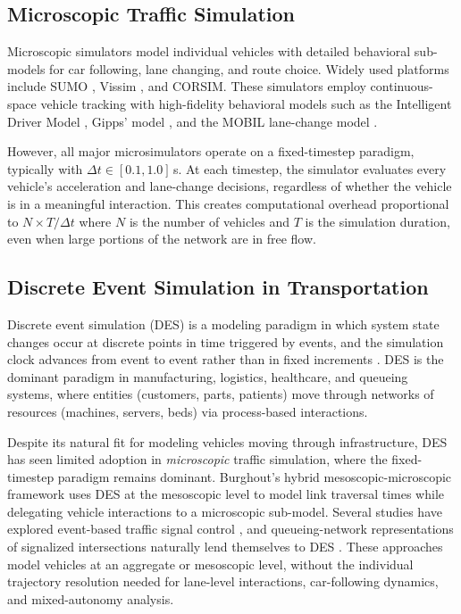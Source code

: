 \documentclass[review,authoryear]{elsarticle}
\begin{document}
\subsection{Microscopic Traffic Simulation}
\label{sec:lit_microsim}

Microscopic simulators model individual vehicles with detailed behavioral sub-models for car following, lane changing, and route choice. Widely used platforms include SUMO \citep{lopez2018microscopic}, Vissim \citep{fellendorf2010microscopic}, and CORSIM. These simulators employ continuous-space vehicle tracking with high-fidelity behavioral models such as the Intelligent Driver Model \citep[IDM;][]{treiber2000congested}, Gipps' model \citep{gipps1981behavioural}, and the MOBIL lane-change model \citep{kesting2007general}.

However, all major microsimulators operate on a fixed-timestep paradigm, typically with $\Delta t \in [0.1, 1.0]$\,s. At each timestep, the simulator evaluates every vehicle's acceleration and lane-change decisions, regardless of whether the vehicle is in a meaningful interaction. This creates computational overhead proportional to $N \times T / \Delta t$ where $N$ is the number of vehicles and $T$ is the simulation duration, even when large portions of the network are in free flow.

\subsection{Discrete Event Simulation in Transportation}
\label{sec:lit_des}

Discrete event simulation (DES) is a modeling paradigm in which system state changes occur at discrete points in time triggered by events, and the simulation clock advances from event to event rather than in fixed increments \citep{banks2010discrete}. DES is the dominant paradigm in manufacturing, logistics, healthcare, and queueing systems, where entities (customers, parts, patients) move through networks of resources (machines, servers, beds) via process-based interactions.

Despite its natural fit for modeling vehicles moving through infrastructure, DES has seen limited adoption in \emph{microscopic} traffic simulation, where the fixed-timestep paradigm remains dominant. Burghout's hybrid mesoscopic-microscopic framework \citep{burghout2005hybrid} uses DES at the mesoscopic level to model link traversal times while delegating vehicle interactions to a microscopic sub-model. Several studies have explored event-based traffic signal control \citep{barcelo2010models}, and queueing-network representations of signalized intersections naturally lend themselves to DES \citep{osorio2013simulation}. These approaches model vehicles at an aggregate or mesoscopic level, without the individual trajectory resolution needed for lane-level interactions, car-following dynamics, and mixed-autonomy analysis.
\end{document}

